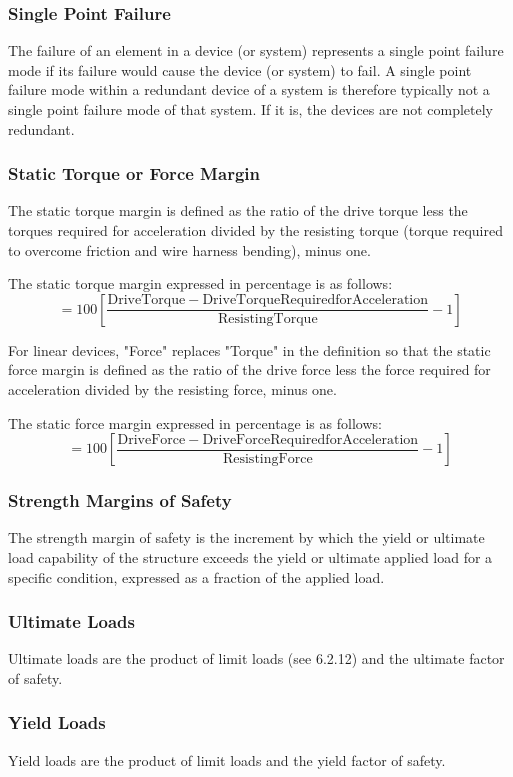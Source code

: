 \documentclass[12pt]{article}
\begin{document}
\subsubsection{Single Point Failure}
The failure of an element in a device (or system) represents a single point failure mode if its failure would cause the device (or system) to fail. 
A single point failure mode within a redundant device of a system is therefore typically not a single point failure mode of that system. 
If it is, the devices are not completely redundant.

\subsubsection{Static Torque or Force Margin}
The static torque margin is defined as the ratio of the drive torque less the torques required for acceleration divided by the resisting torque (torque required to overcome friction and wire harness bending), minus one.

The static torque margin expressed in percentage is as follows:
$$ = 100 \left[ \frac{\mathrm{Drive Torque - Drive Torque Required for Acceleration}}{\mathrm{Resisting Torque}} - 1\right] $$

For linear devices, "Force" replaces "Torque" in the definition so that the static force margin is defined as the ratio of the drive force less the force required for acceleration divided by the resisting force, minus one.

The static force margin expressed in percentage is as follows:
$$ = 100 \left[ \frac{\mathrm{Drive Force - Drive Force Required for Acceleration}}{\mathrm{Resisting Force}} - 1\right] $$

\subsubsection{Strength Margins of Safety}
The strength margin of safety is the increment by which the yield or ultimate load capability of the structure exceeds the yield or ultimate applied load for a specific condition, expressed as a fraction of the applied load.

\subsubsection{Ultimate Loads}
Ultimate loads are the product of limit loads (see 6.2.12) and the ultimate factor of safety.

\subsubsection{Yield Loads}
Yield loads are the product of limit loads and the yield factor of safety.
\end{document}
